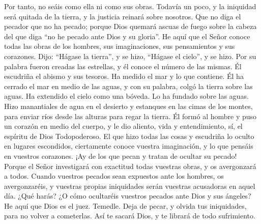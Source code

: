  Por tanto, no seáis como ella ni como sus obras.
 Todavía un poco, y la iniquidad será quitada de la
tierra, y la justicia reinará sobre nosotros.  Que no
diga el pecador que no ha pecado; porque Dios quemará ascuas de fuego
sobre la cabeza del que diga ``no he pecado ante Dios y su gloria''.
 He aquí que el Señor conoce todas las obras de los
hombres, sus imaginaciones, sus pensamientos y sus corazones.
 Dijo: ``Hágase la tierra'', y se hizo, ``Hágase el
cielo'', y se hizo.  Por su palabra fueron creadas las
estrellas, y él conoce el número de las mismas.  Él
escudriña el abismo y sus tesoros. Ha medido el mar y lo que contiene.
 Él ha cerrado el mar en medio de las aguas, y con su
palabra, colgó la tierra sobre las aguas.  Ha extendido
el cielo como una bóveda. Lo ha fundado sobre las aguas. 
Hizo manantiales de agua en el desierto y estanques en las cimas de los
montes, para enviar ríos desde las alturas para regar la tierra.
 Él formó al hombre y puso un corazón en medio del
cuerpo, y le dio aliento, vida y entendimiento,  sí, el
espíritu de Dios Todopoderoso. El que hizo todas las cosas y escudriña
lo oculto en lugares escondidos,  ciertamente conoce
vuestra imaginación, y lo que pensáis en vuestros corazones. ¡Ay de los
que pecan y tratan de ocultar su pecado!  Porque el Señor
investigará con exactitud todas vuestras obras, y os avergonzará a
todos.  Cuando vuestros pecados sean expuestos ante los
hombres, os avergonzaréis, y vuestras propias iniquidades serán vuestras
acusadoras en aquel día.  ¿Qué harás? ¿O cómo ocultaréis
vuestros pecados ante Dios y sus ángeles?  He aquí que
Dios es el juez. Temedle. Deja de pecar, y olvida tus iniquidades, para
no volver a cometerlas. Así te sacará Dios, y te librará de todo
sufrimiento.

